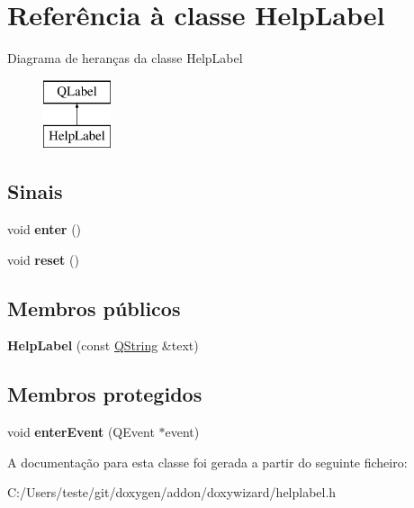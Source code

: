 \hypertarget{class_help_label}{\section{Referência à classe Help\-Label}
\label{class_help_label}
}
Diagrama de heranças da classe Help\-Label\begin{figure}[H]
\begin{center}
\leavevmode
\includegraphics[height=2.000000cm]{class_help_label}
\end{center}
\end{figure}
\subsection*{Sinais}
\begin{DoxyCompactItemize}
\item 
\hypertarget{class_help_label_a2759dad6560aaf485b16356d7142d69d}{void {\bfseries enter} ()}\label{class_help_label_a2759dad6560aaf485b16356d7142d69d}

\item 
\hypertarget{class_help_label_ad20897c5c8bd47f5d4005989bead0e55}{void {\bfseries reset} ()}\label{class_help_label_ad20897c5c8bd47f5d4005989bead0e55}

\end{DoxyCompactItemize}
\subsection*{Membros públicos}
\begin{DoxyCompactItemize}
\item 
\hypertarget{class_help_label_ad774b80bcac95812aa2d18269999209d}{{\bfseries Help\-Label} (const \hyperlink{class_q_string}{Q\-String} \&text)}\label{class_help_label_ad774b80bcac95812aa2d18269999209d}

\end{DoxyCompactItemize}
\subsection*{Membros protegidos}
\begin{DoxyCompactItemize}
\item 
\hypertarget{class_help_label_a5edce8f98a7b7ab40e4c7b8787475e39}{void {\bfseries enter\-Event} (Q\-Event $\ast$event)}\label{class_help_label_a5edce8f98a7b7ab40e4c7b8787475e39}

\end{DoxyCompactItemize}


A documentação para esta classe foi gerada a partir do seguinte ficheiro\-:\begin{DoxyCompactItemize}
\item 
C\-:/\-Users/teste/git/doxygen/addon/doxywizard/helplabel.\-h\end{DoxyCompactItemize}
